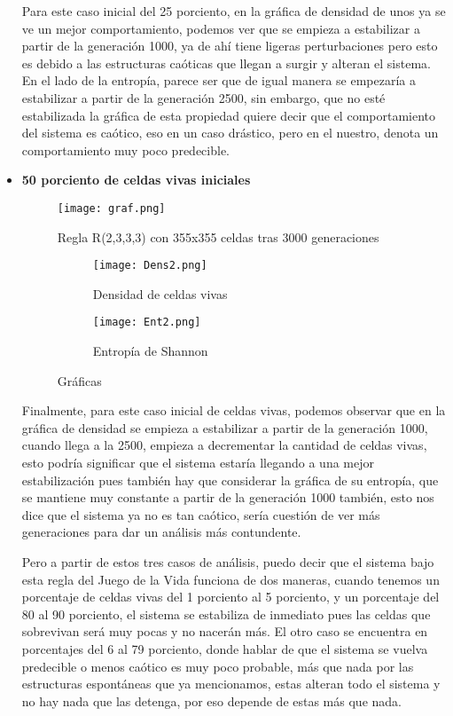 \documentclass{article}
\begin{document}
\begin{itemize}
	 	Para este caso inicial del 25 porciento, en la gráfica de densidad de unos ya se ve un mejor comportamiento, podemos ver que se empieza a estabilizar a partir de la generación 1000, ya de ahí tiene ligeras perturbaciones pero esto es debido a las estructuras caóticas que llegan a surgir y alteran el sistema. En el lado de la entropía, parece ser que de igual manera se empezaría a estabilizar a partir de la generación 2500, sin embargo, que no esté estabilizada la gráfica de esta propiedad quiere decir que el comportamiento del sistema es caótico, eso en un caso drástico, pero en el nuestro, denota un comportamiento muy poco predecible. 
	 	\vspace{300pt}	
	 	\item \textbf{50 porciento de celdas vivas iniciales}
	 	
	 		\begin{figure}[htbp]
	 		\centering       
	 		\texttt{[image: graf.png]}
	 		\caption{Regla R(2,3,3,3) con 355x355 celdas tras 3000 generaciones}
	 		\label{fig:30} 
	 	\end{figure}
	 	
	 	
	 	\begin{figure}[htbp]
	 		\centering
	 		\begin{subfigure}{0.48\textwidth}
	 			\centering
	 			\texttt{[image: Dens2.png]}
	 			\caption{Densidad de celdas vivas}
	 			\label{fig:A547}
	 		\end{subfigure}
	 		\hfill
	 		\begin{subfigure}{0.48\textwidth}
	 			\centering
	 			\texttt{[image: Ent2.png]}
	 			\caption{Entropía de Shannon}
	 			\label{fig:A6}
	 		\end{subfigure}
	 		\caption{Gráficas}
	 		\label{fig:A77}
	 	\end{figure}
	 
	 Finalmente, para este caso inicial de celdas vivas, podemos observar que en la gráfica de densidad se empieza a estabilizar a partir de la generación 1000, cuando llega a la 2500, empieza a decrementar la cantidad de celdas vivas, esto podría significar que el sistema estaría llegando a una mejor estabilización pues también hay que considerar la gráfica de su entropía, que se mantiene muy constante a partir de la generación 1000 también, esto nos dice que el sistema ya no es tan caótico, sería cuestión de ver más generaciones para dar un análisis más contundente. 
	 
	 Pero a partir de estos tres casos de análisis, puedo decir que el sistema bajo esta regla del Juego de la Vida funciona de dos maneras, cuando tenemos un porcentaje de celdas vivas del 1 porciento al 5 porciento, y un porcentaje del 80 al 90 porciento, el sistema se estabiliza de inmediato pues las celdas que sobrevivan será muy pocas y no nacerán más. El otro caso se encuentra en porcentajes del 6 al 79 porciento, donde hablar de que el sistema se vuelva predecible o menos caótico es muy poco probable, más que nada por las estructuras espontáneas que ya mencionamos, estas alteran todo el sistema y no hay nada que las detenga, por eso depende de estas más que nada. 
	 \end{itemize}
 	\vspace{300pt}
\end{document}
